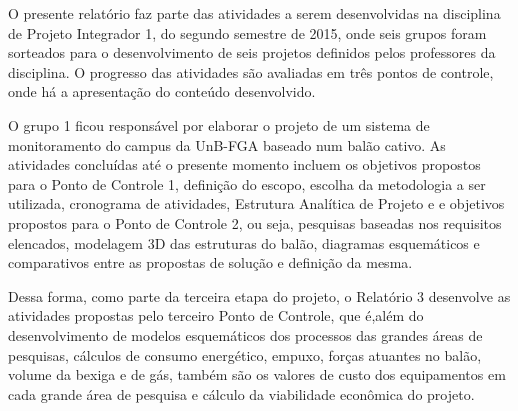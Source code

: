 
O presente relatório faz parte das atividades a serem desenvolvidas na disciplina de Projeto Integrador 1, do segundo semestre de 2015, onde seis grupos foram sorteados para o desenvolvimento de seis projetos definidos pelos professores da disciplina. O progresso das atividades são avaliadas em três pontos de controle, onde há a apresentação do conteúdo desenvolvido.

O grupo 1 ficou responsável por elaborar o projeto de um sistema de monitoramento do campus da UnB-FGA baseado num balão cativo. As atividades concluídas até o presente momento incluem os objetivos propostos para o Ponto de Controle 1, definição do escopo, escolha da metodologia a ser utilizada, cronograma de atividades, Estrutura Analítica de Projeto e e objetivos propostos para o Ponto de Controle 2, ou seja, pesquisas baseadas nos requisitos elencados, modelagem 3D das estruturas do balão, diagramas esquemáticos e comparativos entre as propostas de solução e definição da mesma.

Dessa forma, como parte da terceira etapa do projeto, o Relatório 3 desenvolve  as atividades propostas pelo terceiro Ponto de Controle, que é,além do desenvolvimento de modelos esquemáticos dos processos das grandes áreas de pesquisas, cálculos de consumo energético, empuxo, forças atuantes no balão, volume da bexiga e de gás, também são os valores de custo dos equipamentos em cada grande área de pesquisa e cálculo da viabilidade econômica do projeto. 